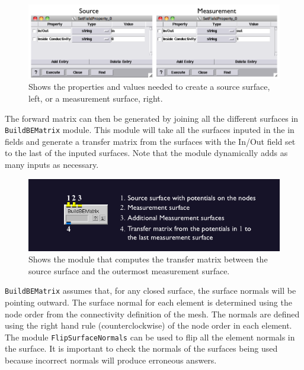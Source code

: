 \begin{figure}[H]
\begin{center}
\includegraphics[width=\textwidth]{ECGToolkitGuide_figures/SetFieldPropGUI.png}
\caption{Shows the properties and values needed to create a source surface, left, or a
measurement surface, right.}
\label{SetFieldPropGUI}
\end{center}
\end{figure}


The forward matrix can then be generated by joining all the different surfaces in {\tt BuildBEMatrix} module.
This module will take all the surfaces inputed in the in fields and generate a transfer matrix from the surfaces with the
In/Out field set to the last of the inputed surfaces. Note that the module dynamically adds as many inputs as necessary.

\begin{figure}[H]
\begin{center}
\includegraphics[width=\textwidth]{ECGToolkitGuide_figures/BEMmod.png}
\caption{Shows the module that computes the transfer matrix between the source surface
and the outermost measurement surface.}
\label{BEM}
\end{center}
\end{figure}

{\tt BuildBEMatrix} assumes that, for any closed surface, the surface normals will be pointing outward. The surface
normal for each element is determined using the node order from the connectivity definition of the mesh. The
normals are defined using the right hand rule (counterclockwise) of the node order in each element. The
module {\tt FlipSurfaceNormals} can be used to flip all the element normals in the surface. It is important to check
the normals of the surfaces being used because incorrect normals will produce erroneous answers.

